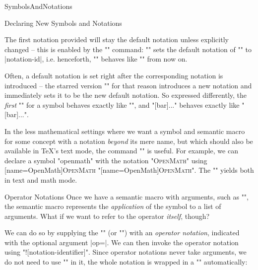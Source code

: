 \begin{smodule}[ns=https://github.com/slatex/sTeX/doc]{SymbolsAndNotations}
\begin{sfragment}{Declaring New Symbols and Notations}
\begin{function}{\setnotation}
  The first notation provided will stay the default notation unless explicitly changed --
  this is enabled by the \stexcode"\setnotation" command:
  \stexcode"" sets the default notation of
  \stexcode"\symbolname" to |notation-id|, i.e. henceforth, \stexcode"\symbolname" behaves
  like \stexcode"\symbolname[notation-id]" from now on.
\end{function}

Often, a default notation is set right after the corresponding notation is introduced --
the starred version \stexcode"\notation*" for that reason introduces a new notation and
immediately sets it to be the new default notation. So expressed differently, the
\emph{first} \stexcode"\notation" for a symbol behaves exactly like \stexcode"\notation*",
and \stexcode"[bar]{...}" behaves exactly like
\stexcode"[bar]{...}".

\begin{function}{\textsymdecl}
  In the less mathematical settings where we want a symbol and
  semantic macro for some concept with a notation \emph{beyond}
  its mere name, but which should also be available in \TeX's text
  mode, the command \stexcode"\textsymdecl" is useful.
  For example, we can declare a symbol \stexcode"openmath"
  with the notation \stexcode"\textsc{OpenMath}" using
  [name=OpenMath]{\textsc{OpenMath}}
  \stexcode"[name=OpenMath]{\textsc{OpenMath}}".
  The \stexcode"\openmath" yields \openmath both in text and math
  mode.
\end{function}
    
\begin{sfragment}{Operator Notations}
  Once we have a semantic macro with arguments, such as \stexcode"\newbinarysymbol", the
  semantic macro represents the \emph{application} of the symbol to a list of
  arguments. What if we want to refer to the operator \emph{itself}, though?

  We can do so by supplying the \stexcode"\notation" (or \stexcode"\symdef") with an
  \emph{operator notation}, indicated with the optional argument |op=|.  We can then
  invoke the operator notation using \stexcode"\symbolname![notation-identifier]".  Since
  operator notations never take arguments, we do not need to use \stexcode"\comp" in it,
  the whole notation is wrapped in a \stexcode"\comp" automatically:


\end{sfragment}
\end{sfragment}
\end{smodule}
